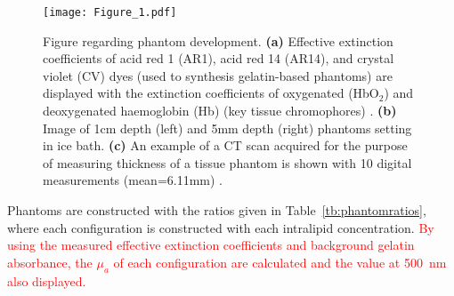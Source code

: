 \begin{figure}[htb]
    \centering%
    \texttt{[image: Figure\_1.pdf]}
    \caption{Figure regarding phantom development. 
    \textbf{(a)}
    Effective extinction coefficients of acid red 1 (AR1), acid red 14 (AR14), and crystal violet (CV) dyes 
    (used to synthesis gelatin-based phantoms)
    are displayed with the extinction coefficients of oxygenated (HbO$_2$) and deoxygenated haemoglobin (Hb) 
    (key tissue chromophores)
    .
    \textbf{(b)}
    Image of 1cm depth (left) and 5mm depth (right) phantoms setting in ice bath.
    \textbf{(c)}
    An example of a CT scan acquired for the purpose of measuring thickness of a tissue phantom is shown with
    10 digital measurements (mean=6.11mm)%
    .}
    \label{fig:phantommethods}%
\end{figure}

Phantoms are constructed with the ratios given in Table~\ref{tb:phantomratios}, where each configuration is constructed with each intralipid concentration. \textcolor{red}{By using the measured effective extinction coefficients and background gelatin absorbance, the $\mu_a$ of each configuration are calculated and the value at 500~nm also displayed.}

